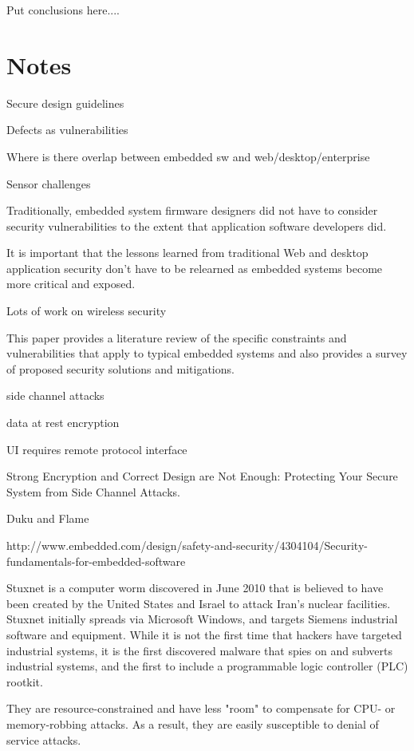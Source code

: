 \documentclass[final,conference,10pt]{IEEEtran}
\begin{document}
Put conclusions here....



\pagebreak

\section{Notes}
Secure design guidelines

Defects as vulnerabilities 

Where is there overlap between embedded sw and web/desktop/enterprise

Sensor challenges

Traditionally, embedded system firmware designers did not have to consider security vulnerabilities to the extent that application software developers did.  

It is important that the lessons learned from traditional Web and desktop application security don't have to be relearned as embedded systems become more critical and exposed.

Lots of work on wireless security

This paper provides a literature review of the specific constraints and vulnerabilities that apply to typical embedded systems and also provides a survey of proposed security solutions and mitigations. 


side channel attacks

		data at rest encryption		

		UI requires remote protocol interface

		Strong Encryption and Correct Design are Not Enough: Protecting Your Secure System from Side Channel Attacks.

		Duku and Flame

http://www.embedded.com/design/safety-and-security/4304104/Security-fundamentals-for-embedded-software

		Stuxnet is a computer worm discovered in June 2010 that is believed to have been created by the United States and Israel to attack Iran's nuclear facilities. Stuxnet initially spreads via Microsoft Windows, and targets Siemens industrial software and equipment. While it is not the first time that hackers have targeted industrial systems, it is the first discovered malware that spies on and subverts industrial systems, and the first to include a programmable logic controller (PLC) rootkit.

		They are resource-constrained and have less "room" to compensate for CPU- or memory-robbing attacks. As a result, they are easily susceptible to denial of service attacks.
\end{document}
